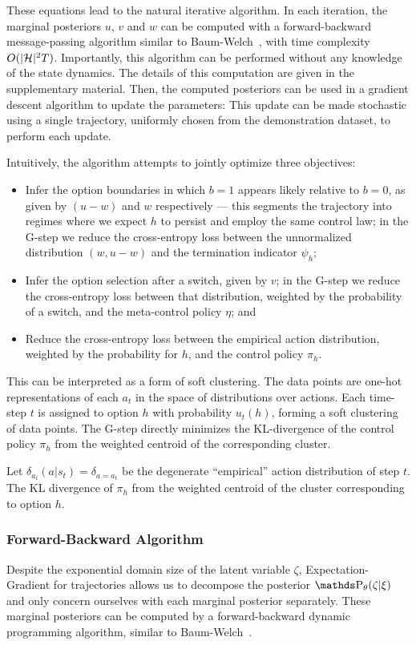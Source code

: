 These equations lead to the natural iterative algorithm. In each iteration, the marginal posteriors $u$, $v$ and $w$ can be computed with a forward-backward message-passing algorithm similar to Baum-Welch~\cite{baum1972equality}, with time complexity $O(|\mathcal{H}|^2 T)$. Importantly, this algorithm can be performed without any knowledge of the state dynamics. The details of this computation are given in the supplementary material.
Then, the computed posteriors can be used in a gradient descent algorithm to update the parameters:
This update can be made stochastic using a single trajectory, uniformly chosen from the demonstration dataset, to perform each update.

Intuitively, the algorithm attempts to jointly optimize three objectives:
\begin{itemize}
    \item Infer the option boundaries in which $b=1$ appears likely relative to $b=0$, as given by $(u-w)$ and $w$ respectively --- this segments the trajectory into regimes where we expect $h$ to persist and employ the same control law; in the G-step we reduce the cross-entropy loss between the unnormalized distribution $(w,u-w)$ and the termination indicator $\psi_h$;
    \item Infer the option selection after a switch, given by $v$; in the G-step we reduce the cross-entropy loss between that distribution, weighted by the probability of a switch, and the meta-control policy $\eta$; and
    \item Reduce the cross-entropy loss between the empirical action distribution, weighted by the probability for $h$, and the control policy $\pi_h$.
\end{itemize}
This can be interpreted as a form of soft clustering. 
The data points are one-hot representations of each $a_t$ in the space of distributions over actions.
Each time-step $t$ is assigned to option $h$ with probability $u_t(h)$, forming a soft clustering of data points.
The G-step directly minimizes the KL-divergence of the control policy $\pi_h$ from the weighted centroid of the corresponding cluster.

Let $\delta_{a_t}(a|s_t)=\delta_{a=a_t}$ be the degenerate ``empirical'' action distribution of step $t$.
The KL divergence of $\pi_h$ from the weighted centroid of the cluster corresponding to option $h$.

\subsubsection{Forward-Backward Algorithm}
Despite the exponential domain size of the latent variable $\zeta$, Expectation-Gradient for trajectories allows us to decompose the posterior $\p_\theta(\zeta \given \xi)$ and only concern ourselves with each marginal posterior separately. These marginal posteriors can be computed by a forward-backward dynamic programming algorithm, similar to Baum-Welch~\cite{?}.

